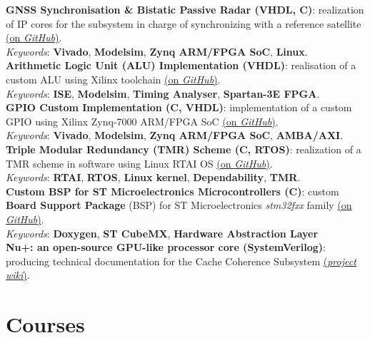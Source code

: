 \documentclass[letterpaper]{twentysecondcv} %
\begin{document}
\textbf{GNSS Synchronisation \& Bistatic Passive Radar (VHDL, C)}: realization of IP cores for the subsystem in charge of synchronizing with a reference satellite \href{https://github.com/artic92/sistemi-embedded-task2}{(on \textit{GitHub})}.\\
\textit{Keywords}: \textbf{Vivado}, \textbf{Modelsim}, \textbf{Zynq ARM/FPGA SoC}, \textbf{Linux}.\\
\textbf{Arithmetic Logic Unit (ALU) Implementation (VHDL)}: realisation of a custom ALU using Xilinx toolchain \href{https://github.com/artic92/alu_xilinx}{(on \textit{GitHub})}.\\
\textit{Keywords}: \textbf{ISE}, \textbf{Modelsim}, \textbf{Timing Analyser}, \textbf{Spartan-3E FPGA}. \\
\textbf{GPIO Custom Implementation (C, VHDL)}: implementation of a custom GPIO using Xilinx Zynq-7000 ARM/FPGA SoC \href{https://github.com/artic92/gpio-zynq-7000}{(on \textit{GitHub})}.\\
\textit{Keywords}: \textbf{Vivado}, \textbf{Modelsim}, \textbf{Zynq ARM/FPGA SoC}, \textbf{AMBA/AXI}.\\
\textbf{Triple Modular Redundancy (TMR) Scheme (C, RTOS)}: realization of a TMR scheme in software using Linux RTAI OS  \href{https://github.com/artic92/tmr_rtai}{(on \textit{GitHub})}.\\
 \textit{Keywords}: \textbf{RTAI}, \textbf{RTOS}, \textbf{Linux kernel}, \textbf{Dependability}, \textbf{TMR}.\\
\textbf{Custom BSP for ST Microelectronics Microcontrollers (C)}: custom \textbf{Board Support Package} (BSP) for ST Microelectronics \textit{stm32fxx} family \href{https://github.com/artic92/stm32-bsp}{(on \textit{GitHub})}.\\
\textit{Keywords}: \textbf{Doxygen}, \textbf{ST CubeMX}, \textbf{Hardware Abstraction Layer} \\
\textbf{Nu+: an open-source GPU-like processor core (SystemVerilog)}: producing technical documentation for the Cache Coherence Subsystem \href{ http://www.naplespu.com/doc/index.php?title=Main_Page}{(\textit{project wiki})}.


\section{Courses}
\end{document}
